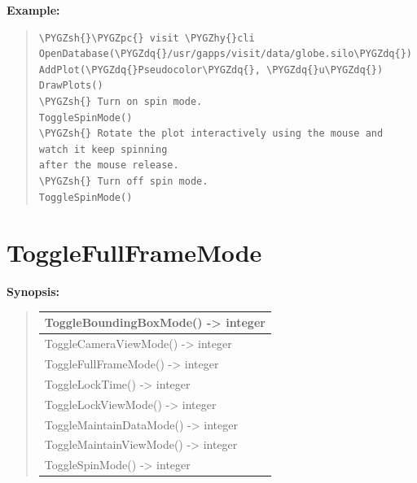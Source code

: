 \documentclass[letterpaper,10pt,english]{sphinxmanual}
\def\PYGZsh{\char`\#}
\def\PYGZpc{\char`\%}
\def\PYGZhy{\char`\-}
\def\PYGZdq{\char`\"}
\begin{document}
\begin{DUlineblock}{0em}
\item[] \textbf{Example:}
\item[] 
\end{DUlineblock}
\begin{quote}

\begin{Verbatim}[commandchars=\\\{\}]
\PYGZsh{}\PYGZpc{} visit \PYGZhy{}cli
OpenDatabase(\PYGZdq{}/usr/gapps/visit/data/globe.silo\PYGZdq{})
AddPlot(\PYGZdq{}Pseudocolor\PYGZdq{}, \PYGZdq{}u\PYGZdq{})
DrawPlots()
\PYGZsh{} Turn on spin mode.
ToggleSpinMode()
\PYGZsh{} Rotate the plot interactively using the mouse and watch it keep spinning
after the mouse release.
\PYGZsh{} Turn off spin mode.
ToggleSpinMode()
\end{Verbatim}
\end{quote}


\section{ToggleFullFrameMode}
\label{functions:togglefullframemode}
\begin{DUlineblock}{0em}
\item[] \textbf{Synopsis:}
\end{DUlineblock}
\begin{quote}

\begin{tabulary}{\linewidth}{|L|}
\hline

ToggleBoundingBoxMode() -\textgreater{} integer
\\
\hline
ToggleCameraViewMode() -\textgreater{} integer
\\
\hline
ToggleFullFrameMode() -\textgreater{} integer
\\
\hline
ToggleLockTime() -\textgreater{} integer
\\
\hline
ToggleLockViewMode() -\textgreater{} integer
\\
\hline
ToggleMaintainDataMode() -\textgreater{} integer
\\
\hline
ToggleMaintainViewMode() -\textgreater{} integer
\\
\hline
ToggleSpinMode() -\textgreater{} integer
\\
\hline\end{tabulary}

\end{quote}
\end{document}
